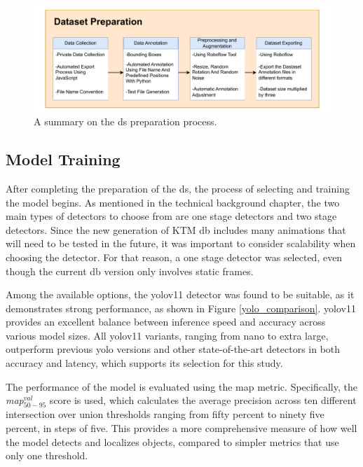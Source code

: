 \begin{figure}[!h]
    \centering
    \includegraphics[width=1\textwidth]{Figures/diagrams/DS_Prep.pdf}
    \caption{A summary on the \gls{ds} preparation process.}
    \label{DS_Prep}
\end{figure}

\subsection{Model Training}
After completing the preparation of the \gls{ds}, the process of selecting and training the model begins. As mentioned in the technical background chapter, the two main types of detectors to choose from are one stage detectors and two stage detectors. Since the new generation of KTM \gls{db} includes many animations that will need to be tested in the future, it was important to consider scalability when choosing the detector. For that reason, a one stage detector was selected, even though the current \gls{db} version only involves static frames.

Among the available options, the \gls{yolo}v11 detector was found to be suitable, as it demonstrates strong performance, as shown in Figure \ref{yolo_comparison}. \gls{yolo}v11 provides an excellent balance between inference speed and accuracy across various model sizes. All \gls{yolo}v11 variants, ranging from nano to extra large, outperform previous \gls{yolo} versions and other state-of-the-art detectors in both accuracy and latency, which supports its selection for this study.

The performance of the model is evaluated using the \gls{map} metric. Specifically, the \textit{\gls{map}}$_{50-95}^{val}$ score is used, which calculates the average precision across ten different intersection over union thresholds ranging from fifty percent to ninety five percent, in steps of five. This provides a more comprehensive measure of how well the model detects and localizes objects, compared to simpler metrics that use only one threshold.

